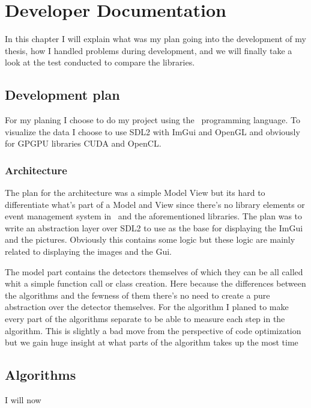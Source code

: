 \chapter{Developer Documentation}

In this chapter I will explain what was my plan going into the development of my thesis, how I handled problems during development, and we will finally take a look at the test conducted to compare the libraries.

\section{Development plan}

For my planing I choose to do my project using the \CC\ programming language. To visualize the data I choose to use \ac{SDL2} with \ac{ImGui} and OpenGL and obviously for \ac{GPGPU} libraries CUDA and OpenCL.

\subsection{Architecture}

The plan for the architecture was a simple Model View but its hard to differentiate what's part of a Model and View since there's no library elements or event management system in \CC\ and the aforementioned libraries. The plan was to write an abstraction layer over \ac{SDL2} to use as the base for displaying the \ac{ImGui} and the pictures. Obviously this contains some logic but these logic are mainly related to displaying the images and the Gui.

The model part contains the detectors themselves of which they can be all called whit a simple function call or class creation. Here because the differences between the algorithms and the fewness of them there's no need to create a pure abstraction over the detector themselves. For the algorithm I planed to make every part of the algorithms separate to be able to measure each step in the algorithm. This is slightly a bad move from the perspective of code optimization but we gain huge insight at what parts of the algorithm takes up the most time

\section{Algorithms}

I will now 
